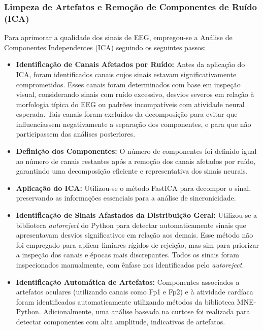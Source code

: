 \subsubsection{Limpeza de Artefatos e Remoção de Componentes de Ruído (ICA)}
Para aprimorar a qualidade dos sinais de EEG, empregou-se a Análise de Componentes Independentes (ICA) seguindo os seguintes passos:
\begin{itemize}
    \item \textbf{Identificação de Canais Afetados por Ruído:} Antes da aplicação do ICA, foram identificados canais cujos sinais estavam significativamente comprometidos. Esses canais foram determinados com base em inspeção visual, considerando sinais com ruído excessivo, desvios severos em relação à morfologia típica do EEG ou padrões incompatíveis com atividade neural esperada. Tais canais foram excluídos da decomposição para evitar que influenciassem negativamente a separação dos componentes, e para que não participassem das análises posteriores.
    \item \textbf{Definição dos Componentes:} O número de componentes foi definido igual ao número de canais restantes após a remoção dos canais afetados por ruído, garantindo uma decomposição eficiente e representativa dos sinais neurais. 
    \item \textbf{Aplicação do ICA:} Utilizou-se o método FastICA para decompor o sinal, preservando as informações essenciais para a análise de sincronicidade. 
    \item \textbf{Identificação de Sinais Afastados da Distribuição Geral:} Utilizou-se a biblioteca \textit{autoreject} do Python para detectar automaticamente sinais que apresentavam desvios significativos em relação aos demais. Esse método não foi empregado para aplicar limiares rígidos de rejeição, mas sim para priorizar a inspeção dos canais e épocas mais discrepantes. Todos os sinais foram inspecionados manualmente, com ênfase nos identificados pelo \textit{autoreject}.
    \item \textbf{Identificação Automática de Artefatos:} Componentes associados a artefatos oculares (utilizando canais como Fp1 e Fp2) e à atividade cardíaca foram identificados automaticamente utilizando métodos da biblioteca MNE-Python. Adicionalmente, uma análise baseada na curtose foi realizada para detectar componentes com alta amplitude, indicativos de artefatos. 

\end{itemize}
